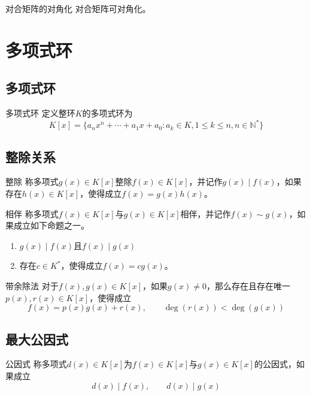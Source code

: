 \documentclass[lang = cn, scheme = chinese, thmcnt = section]{elegantbook}
\newcommand{\N}{\mathbb{N}}            %
\begin{document}
\begin{proposition}{对合矩阵的对角化}
	对合矩阵可对角化。
\end{proposition}

\chapter{多项式环}

\section{多项式环}

\begin{definition}{多项式环}
	定义整环$K$的多项式环为
	$$
	K[x]=\{ a_nx^n+\cdots+a_1x+a_0:a_k\in K,1\le k\le n,n\in\N^* \}
	$$
\end{definition}

\section{整除关系}

\begin{definition}{整除}
	称多项式$g(x)\in K[x]$整除$f(x)\in K[x]$，并记作$g(x)\mid f(x)$，如果存在$h(x)\in K[x]$，使得成立$f(x)=g(x)h(x)$。
\end{definition}

\begin{definition}{相伴}
	称多项式$f(x)\in K[x]$与$g(x)\in K[x]$相伴，并记作$f(x)\sim g(x)$，如果成立如下命题之一。
	\begin{enumerate}
		\item $g(x)\mid f(x)$且$f(x)\mid g(x)$
		\item 存在$c\in K^*$，使得成立$f(x)=cg(x)$。
	\end{enumerate}
\end{definition}

\begin{theorem}{带余除法}
	对于$f(x),g(x)\in K[x]$，如果$g(x)\ne 0$，那么存在且存在唯一$p(x),r(x)\in K[x]$，使得成立
	$$
	f(x)=p(x)g(x)+r(x),\qquad \deg (r(x))<\deg (g(x))
	$$
\end{theorem}

\section{最大公因式}

\begin{definition}{公因式}
	称多项式$d(x)\in K[x]$为$f(x)\in K[x]$与$g(x)\in K[x]$的公因式，如果成立
	$$
	d(x)\mid f(x),\qquad d(x)\mid g(x)
	$$
\end{definition}
\end{document}
